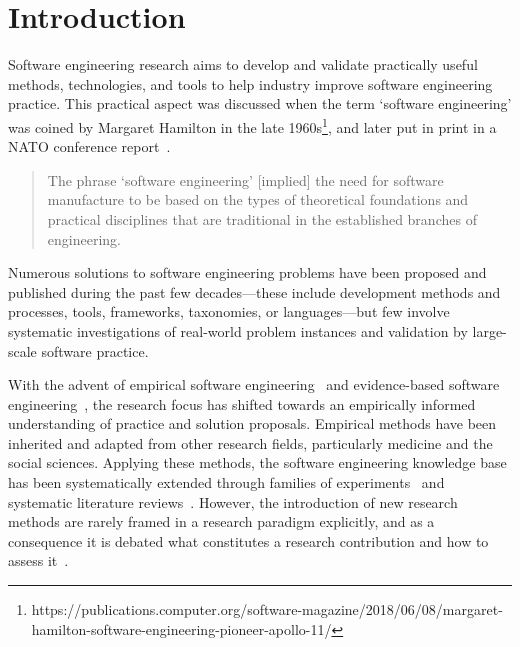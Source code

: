 \documentclass[graybox]{svmult}
\begin{document}
\section{Introduction}
\label{sec:intro}

Software engineering research aims to develop and validate practically useful methods, technologies, and tools to help industry improve software engineering practice. This practical aspect was discussed when the term `software engineering' was coined by Margaret Hamilton in the late 1960s\footnote{https://publications.computer.org/software-magazine/2018/06/08/margaret-hamilton-software-engineering-pioneer-apollo-11/}, and later put in print in a NATO conference report~\citep[p. 13]{Nato1968}. 

\begin{quote}
{The phrase `software engineering'  [implied] the need for software manufacture to be based on the types of theoretical foundations and practical disciplines that are traditional in the established branches of engineering.} 
\end{quote}

Numerous solutions to software engineering problems have been proposed and published during the past few decades---these include development methods and processes, tools, frameworks, taxonomies, or languages---but few involve systematic investigations of real-world problem instances and validation by large-scale software practice.

With the advent of empirical software engineering~\citep{Basili86} and evidence-based software engineering~\citep{Kitchenham04}, the research focus has shifted towards an empirically informed understanding of practice and solution proposals. Empirical methods have been inherited and adapted from other research fields, particularly medicine and the social sciences. Applying these methods, the software engineering knowledge base has been systematically extended through families of experiments~\citep{Basili99} and systematic literature reviews~\citep{Kitchenham15}. However, the introduction of new research methods are rarely  framed in a research paradigm explicitly, and as a consequence it is debated what constitutes a research contribution and how to assess it~\citep{BriandGeneralization2017}.
\end{document}
